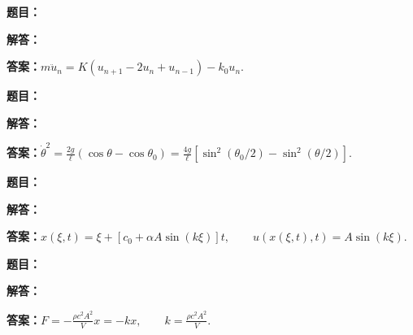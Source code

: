 \documentclass[lang=cn,color=blue,11pt]{elegantbook}
\begin{document}
\noindent\textbf{题目：}
\par\noindent\textbf{解答：}
\par\noindent\textbf{答案：}\(\displaystyle 
m\ddot u_n=K(u_{n+1}-2u_n+u_{n-1})-k_0u_n.
\)\par
\par\smallskip\noindent\hrulefill\par\medskip
{}\par
\noindent\textbf{题目：}
\par\noindent\textbf{解答：}
\par\noindent\textbf{答案：}\(\displaystyle 
\dot\theta^2=\frac{2g}{\ell}(\cos\theta-\cos\theta_0)
=\frac{4g}{\ell}\left[\sin^2(\theta_0/2)-\sin^2(\theta/2)\right].
\)\par
\par\smallskip\noindent\hrulefill\par\medskip
{}\par
\noindent\textbf{题目：}
\par\noindent\textbf{解答：}
\par\noindent\textbf{答案：}\(\displaystyle 
x(\xi,t)=\xi+[c_0+\alpha A\sin(k\xi)]t,\qquad
u(x(\xi,t),t)=A\sin(k\xi).
\)\par
\par\smallskip\noindent\hrulefill\par\medskip
{}\par
\noindent\textbf{题目：}
\par\noindent\textbf{解答：}
\par\noindent\textbf{答案：}\(\displaystyle 
F=-\frac{\rho c^2A^2}{V}x=-kx,\qquad k=\frac{\rho c^2A^2}{V}.
\)\par
\par\smallskip\noindent\hrulefill\par\medskip
{}\par
\end{document}
